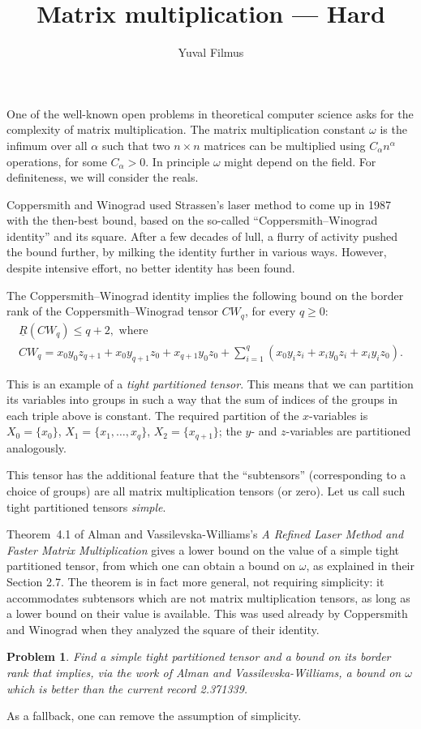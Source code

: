 \documentclass[10pt]{article}
\title{Matrix multiplication --- Hard}
\author{Yuval Filmus}
\date{}
\newtheorem{problem}{Problem}
\begin{document}
\maketitle

One of the well-known open problems in theoretical computer science asks for the complexity of matrix multiplication. The matrix multiplication constant $\omega$ is the infimum over all $\alpha$ such that two $n \times n$ matrices can be multiplied using $C_\alpha n^\alpha$ operations, for some $C_\alpha > 0$. In principle $\omega$ might depend on the field. For definiteness, we will consider the reals.

Coppersmith and Winograd used Strassen's laser method to come up in 1987 with the then-best bound, based on the so-called ``Coppersmith--Winograd identity'' and its square. After a few decades of lull, a flurry of activity pushed the bound further, by milking the identity further in various ways. However, despite intensive effort, no better identity has been found.

The Coppersmith--Winograd identity implies the following bound on the border rank of the Coppersmith--Winograd tensor $\mathit{CW}_q$, for every $q \ge 0$:
\begin{multline*}
 \underline{R}(\mathit{CW}_q) \le q + 2, \text{ where }\\
 \mathit{CW}_q = x_0 y_0 z_{q+1} + x_0 y_{q+1} z_0 + x_{q+1} y_0 z_0 + \sum_{i=1}^q (x_0y_iz_i + x_iy_0z_i + x_iy_iz_0).
\end{multline*}

This is an example of a \emph{tight partitioned tensor}. This means that we can partition its variables into groups in such a way that the sum of indices of the groups in each triple above is constant. The required partition of the $x$-variables is $X_0 = \{x_0\}$, $X_1 = \{x_1,\dots,x_q\}$, $X_2 = \{x_{q+1}\}$; the $y$- and $z$-variables are partitioned analogously.

This tensor has the additional feature that the ``subtensors'' (corresponding to a choice of groups) are all matrix multiplication tensors (or zero). Let us call such tight partitioned tensors \emph{simple}.

Theorem~4.1 of Alman and Vassilevska-Williams's \emph{A Refined Laser Method and Faster Matrix Multiplication} gives a lower bound on the value of a simple tight partitioned tensor, from which one can obtain a bound on $\omega$, as explained in their Section 2.7. The theorem is in fact more general, not requiring simplicity: it accommodates subtensors which are not matrix multiplication tensors, as long as a lower bound on their value is available. This was used already by Coppersmith and Winograd when they analyzed the square of their identity.

\begin{problem}
Find a simple tight partitioned tensor and a bound on its border rank that implies, via the work of Alman and Vassilevska-Williams, a bound on $\omega$ which is better than the current record 2.371339.
\end{problem}

As a fallback, one can remove the assumption of simplicity.
\end{document}
